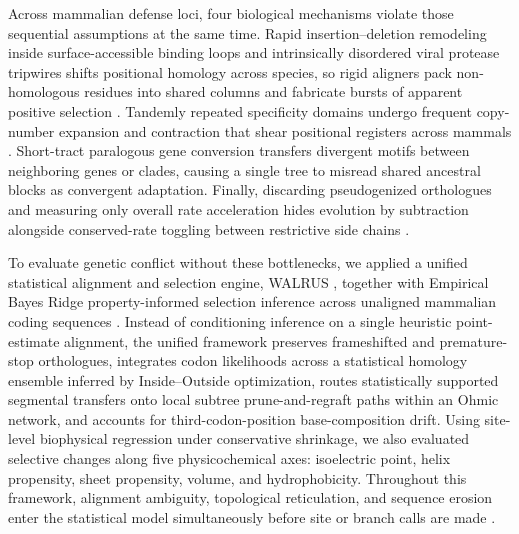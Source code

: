 \documentclass[12pt]{article}
\begin{document}
Across mammalian defense loci, four biological mechanisms violate those sequential assumptions at the same time. Rapid insertion--deletion remodeling inside surface-accessible binding loops and intrinsically disordered viral protease tripwires shifts positional homology across species, so rigid aligners pack non-homologous residues into shared columns and fabricate bursts of apparent positive selection \cite{chavarria2016proteolytic,tsu2021diverse,fletcher2010indelible}. Tandemly repeated specificity domains undergo frequent copy-number expansion and contraction that shear positional registers across mammals \cite{oliver2009prdm9,patel2016prdm9gene}. Short-tract paralogous gene conversion transfers divergent motifs between neighboring genes or clades, causing a single tree to misread shared ancestral blocks as convergent adaptation. Finally, discarding pseudogenized orthologues and measuring only overall rate acceleration hides evolution by subtraction alongside conserved-rate toggling between restrictive side chains \cite{mcewan2009truncated,braun2015loss,munoz2011orphan,tenthorey2020mutational}.

To evaluate genetic conflict without these bottlenecks, we applied a unified statistical alignment and selection engine, WALRUS \cite{kosakovsky2026walrus}, together with Empirical Bayes Ridge property-informed selection inference across unaligned mammalian coding sequences \cite{methods}. Instead of conditioning inference on a single heuristic point-estimate alignment, the unified framework preserves frameshifted and premature-stop orthologues, integrates codon likelihoods across a statistical homology ensemble inferred by Inside--Outside optimization, routes statistically supported segmental transfers onto local subtree prune-and-regraft paths within an Ohmic network, and accounts for third-codon-position base-composition drift. Using site-level biophysical regression under conservative shrinkage, we also evaluated selective changes along five physicochemical axes: isoelectric point, helix propensity, sheet propensity, volume, and hydrophobicity. Throughout this framework, alignment ambiguity, topological reticulation, and sequence erosion enter the statistical model simultaneously before site or branch calls are made \cite{kosakovsky2026walrus,methods}.
\end{document}
